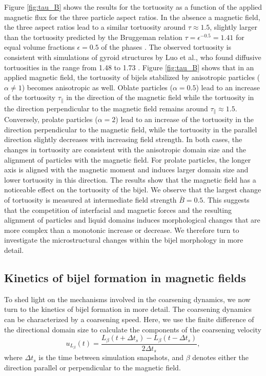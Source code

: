 Figure \ref{fig:tau_B} shows the results for the tortuosity as a
function of the applied magnetic flux for the three particle aspect
ratios. In the absence a magnetic field, the three aspect ratios lead to
a similar tortuosity around $\tau\approx 1.5$, slightly larger than
the tortuosity predicted by the Bruggeman relation
\(\tau=\epsilon^{-0.5}=1.41\) for equal volume fractions
\(\epsilon=0.5\) of the phases
\cite{bruggeman1935tortuosity, tjaden_origin_2016}. The observed
tortuosity is consistent with simulations of gyroid structures by Luo et
al., who found diffusive tortuosities in the range from 1.48 to 1.73
\cite{luo_macroscopic_2020}. Figure \ref{fig:tau_B} shows that in an
applied magnetic field, the tortuosity of bijels stabilized by
anisotropic particles (\(\alpha\neq1\)) becomes anisotropic as well.
Oblate particles (\(\alpha=0.5\)) lead to an increase of the tortuosity
\(\tau_\parallel\) in the direction of the magnetic field while the
tortuosity in the direction perpendicular to the magnetic field remains
around \(\tau_\parallel\approx1.5\). Conversely, prolate particles
(\(\alpha=2\)) lead to an increase of the tortuosity in the direction
perpendicular to the magnetic field, while the tortuosity in the
parallel direction slightly decreases with increasing field strength. In
both cases, the changes in tortuosity are consistent with the
anisotropic domain size and the alignment of particles with the magnetic
field. For prolate particles, the longer axis is aligned with the
magnetic moment and induces larger domain size and lower tortuosity in
this direction. The results show that the magnetic field has a
noticeable effect on the tortuosity of the bijel. We observe that the
largest change of tortuosity is measured at intermediate field strength
\(\bar{B}=0.5\). This suggests that the competition of interfacial and
magnetic forces and the resulting alignment of particles and liquid
domains induces morphological changes that are more complex than a
monotonic increase or decrease. We therefore turn to investigate the
microstructural changes within the bijel morphology in more detail.

\subsection{Kinetics of bijel formation in magnetic fields}

To shed light on the mechanisms involved in the coarsening dynamics,
we now turn to the kinetics of bijel formation in more detail. The
coarsening dynamics can be characterized by a coarsening speed. Here,
we use the finite difference of the directional domain size to
calculate the components of the coarsening velocity
%
\begin{equation}
u_{L_\beta}(t) = \frac{L_\beta(t+\Delta t_s)-L_\beta(t-\Delta t_s)}{2\Delta t_s} ,
\end{equation}
%
where \(\Delta t_s\) is the time between simulation
snapshots, and $\beta$ denotes either the direction parallel or perpendicular to the magnetic field.

